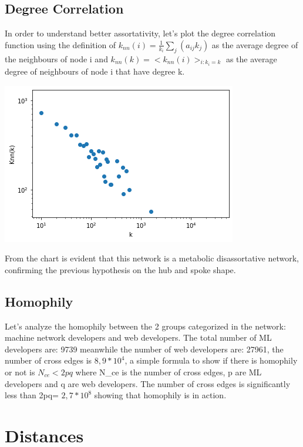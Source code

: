 \documentclass[]{article}
\begin{document}
    \subsection*{Degree Correlation}
    In order to understand better assortativity, let's plot the degree correlation function using the definition of $k_{nn}(i)= \frac{1}{k_i}\sum_j(a_{ij}k_j)$ as the average degree of the neighbours of node i and $k_{nn}(k) = <k_{nn}(i)>_{i:k_i=k}$ as the average degree of neighbours of node i that have degree k.
    \begin{center}
        \includegraphics*[scale=0.5]{charts/assort_plot.png}
    \end{center}
    From the chart is evident that this network is a metabolic disassortative network, confirming the previous hypothesis on the hub and spoke shape. 

    \subsection*{Homophily} 
    Let's analyze the homophily between the 2 groups categorized in the network: machine network developers and web developers. The total number of ML developers are: 9739 meanwhile the number of web developers are: 27961, the number of cross edges is $8,9*10^4$, a simple formula to show if there is homophily or not is $N_{ce} < 2pq$ where N\_ce is the number of cross edges, p are ML developers and q are web developers. The number of cross edges is significantly less than 2pq= $ 2,7*10^8$ showing that homophily is in action.
    
    \section*{Distances}  
\end{document}
